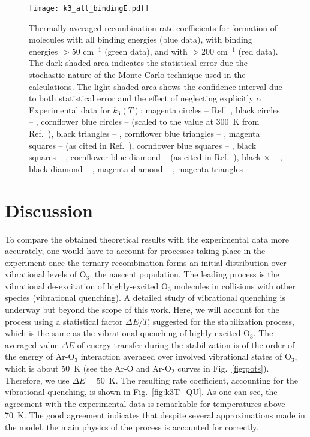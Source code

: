 \documentclass[aps,prl,twocolumn,showpacs,preprintnumbers,amsmath,amssymb,floatfix]{revtex4-2}
\begin{document}

\begin{figure}
	\centering
	\texttt{[image: k3\_all\_bindingE.pdf]}
	\caption{Thermally-averaged recombination rate coefficients for formation of molecules with all binding energies (blue data), with binding energies $>50$ cm$^{-1}$ (green data), and with $>$200 cm$^{-1}$ (red data). The dark shaded area indicates the statistical error due the stochastic nature of the Monte Carlo technique used in the calculations. The light shaded area shows the confidence interval due to both statistical error and the effect of neglecting explicitly $\alpha$. Experimental data for $k_3(T)$: magenta circles -- Ref.~\cite{rawlins1987dynamics}, black circles -- \cite{hippler1990temperature}, cornflower blue circles -- \cite{mulcahy1968kinetics} (scaled to the value at 300~K from Ref.~\cite{kaufman1967m}), black triangles -- \cite{huie1972absolute}, cornflower blue triangles -- \cite{arnold1979temperature}, magenta squares -- \cite{Intezarova1967} (as cited in Ref.~\cite{LUT05:2764}), cornflower blue squares -- \cite{park1977reaction}, black squares -- \cite{sauer1965pulse}, cornflower blue diamond -- \cite{center1975shock} (as cited in Ref.~\cite{LUT05:2764}), black $\times$ -- \cite{bevan1973kinetics}, black diamond -- \cite{kaufman1967m}, magenta diamond -- \cite{slanger1970reaction}, magenta triangles -- \cite{klais1980reinvestigation}.}
	\label{fig:k3T_err_CT}
\end{figure}

\section{\label{sec:disc}Discussion}


 To compare the obtained theoretical results with the experimental data more accurately, one would have to account for processes taking place in the experiment once the ternary recombination forms an initial distribution over vibrational levels of O$_3$, the nascent population. The leading process is the vibrational de-excitation of highly-excited O$_3$ molecules in collisions with other species (vibrational quenching). A detailed study of vibrational quenching is underway but beyond the scope of this work. Here, we will account for the process using a statistical factor $\Delta E/T$, suggested \cite{LUT05:2764,troe1977theory} for the stabilization process, which is the same as the vibrational quenching of highly-excited O$_3$. The averaged value $\Delta E$ of energy transfer during the stabilization is of the order of the energy of  Ar-O$_3$  interaction averaged over involved vibrational states of O$_3$, which is about 50~K (see the Ar-O and Ar-O$_2$ curves in Fig.~\ref{fig:pots}). Therefore, we use $\Delta E=50$~K. The resulting rate coefficient, accounting for the vibrational quenching, is shown in Fig.~\ref{fig:k3T_QU}. As one can see, the agreement with the experimental data is remarkable for temperatures above 70~K. The good agreement indicates that despite several approximations made in the model, the main physics of the process is accounted for correctly. 
\end{document}
